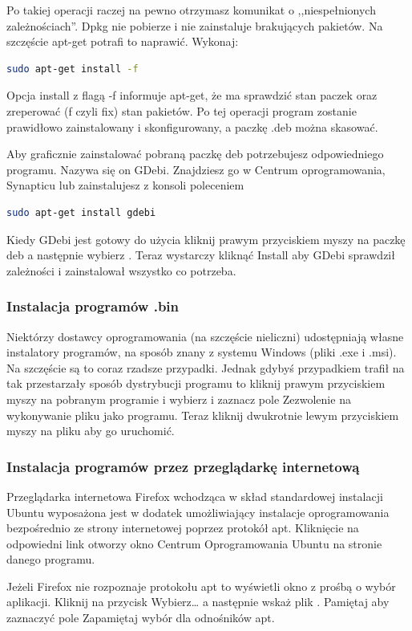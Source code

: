 Po takiej operacji raczej na pewno otrzymasz komunikat o ,,niespełnionych zależnościach''. Dpkg nie pobierze i nie zainstaluje brakujących pakietów. Na szczęście apt-get potrafi to naprawić. Wykonaj:
\begin{lstlisting}[language=bash]
sudo apt-get install -f
\end{lstlisting}
Opcja \textcolor{ubuntu_orange}{install} z flagą \textcolor{ubuntu_orange}{-f} informuje apt-get, że ma sprawdzić stan paczek oraz zreperować (f czyli fix) stan pakietów. Po tej operacji program zostanie prawidłowo zainstalowany i skonfigurowany, a paczkę .deb można skasować.

Aby graficznie zainstalować pobraną paczkę deb potrzebujesz odpowiedniego programu. Nazywa się on \textcolor{ubuntu_orange}{GDebi}. Znajdziesz go w Centrum oprogramowania, Synapticu lub zainstalujesz z konsoli poleceniem
\begin{lstlisting}[language=bash]
sudo apt-get install gdebi
\end{lstlisting}

Kiedy GDebi jest gotowy do użycia kliknij prawym przyciskiem myszy na paczkę deb a następnie wybierz . Teraz wystarczy kliknąć \textcolor{ubuntu_orange}{Install} aby GDebi sprawdził zależności i zainstalował wszystko co potrzeba.

\subsubsection{Instalacja programów .bin}
Niektórzy dostawcy oprogramowania (na szczęście nieliczni) udostępniają własne instalatory programów, na sposób znany z systemu Windows (pliki .exe i .msi). Na szczęście są to coraz rzadsze przypadki. Jednak gdybyś przypadkiem trafił na tak przestarzały sposób dystrybucji programu to kliknij prawym przyciskiem myszy na pobranym programie i wybierz  i zaznacz pole \textcolor{ubuntu_orange}{Zezwolenie na wykonywanie pliku jako programu}. Teraz kliknij dwukrotnie lewym przyciskiem myszy na pliku aby go uruchomić.

\subsubsection{Instalacja programów przez przeglądarkę internetową}
Przeglądarka internetowa Firefox wchodząca w skład standardowej instalacji Ubuntu wyposażona jest w dodatek umożliwiający instalacje oprogramowania bezpośrednio ze strony internetowej poprzez protokół apt. Kliknięcie na odpowiedni link otworzy okno \textcolor{ubuntu_orange}{Centrum Oprogramowania Ubuntu} na stronie danego programu.

Jeżeli Firefox nie rozpoznaje protokołu apt to wyświetli okno z prośbą o wybór aplikacji. Kliknij na przycisk \textcolor{ubuntu_orange}{Wybierz\ldots} a następnie wskaż plik . Pamiętaj aby zaznaczyć pole \textcolor{ubuntu_orange}{Zapamiętaj wybór dla odnośników apt}.